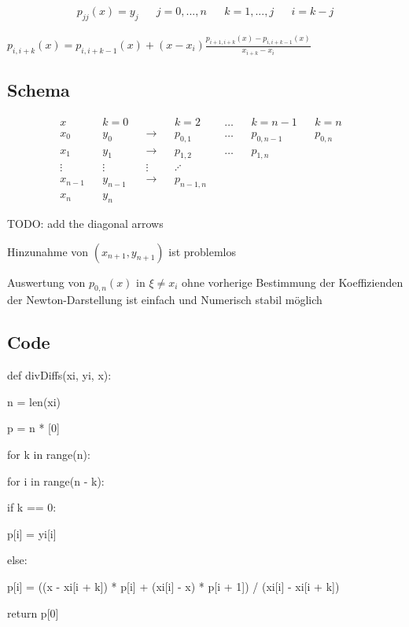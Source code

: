 \documentclass[12pt,a4paper]{article} %
\newcommand*\tab[1][1cm]{\hspace*{#1}}
\begin{document}
	\begin{align*}
		p_{jj}(x) = y_j && j = 0, ..., n && k = 1, ..., j && i = k - j
	\end{align*}
	
	
	$p_{i, i + k}(x) = p_{i, i + k - 1}(x) + (x - x_i)\frac{p_{i + 1, i + k}(x) - p_{i, i + k - 1}(x)}{x_{i + k} - x_i}$
	
	\subsection{Schema}
	
	\begin{align*}
		x && k = 0 && && k = 2 && {}\ldots{} && k = n - 1 && k = n & \\
		x_0 && y_0 && \longrightarrow && p_{0, 1} && {}\ldots{} && p_{0, n - 1} && p_{0, n} & \\
		x_1 && y_1 && \longrightarrow && p_{1, 2} && {}\ldots{} && p_{1, n} & \\
		\vdots && \vdots && \vdots && \iddots & \\
		x_{n - 1} && y_{n - 1} && \longrightarrow && p_{n - 1, n} & \\
		x_n && y_n
	\end{align*}
	
	TODO: add the diagonal arrows
	
	Hinzunahme von $(x_{n + 1}, y_{n + 1})$ ist problemlos
	
	Auswertung von $p_{0, n}(x)$ in $\xi \ne x_i$ ohne vorherige Bestimmung der Koeffizienden der Newton-Darstellung ist einfach und Numerisch stabil möglich
	
	\subsection{Code}
	
	def divDiffs(xi, yi, x):
	
	n = len(xi)
	
	p = n * [0]
	
	for k in range(n):
	
	\tab for i in range(n - k):
	
	\tab \tab if k == 0:

	\tab \tab \tab p[i] = yi[i]
	
	\tab \tab else:
	
	\tab \tab \tab p[i] = ((x - xi[i + k]) * p[i] + (xi[i] - x) * p[i + 1]) / (xi[i] - xi[i + k])
	
	return p[0]	
	
	\newpage
	
\end{document}
